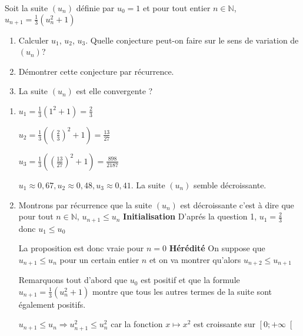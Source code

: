 
%
Soit la suite $\left(u_{n}\right)$ définie par $u_{0}=1$ et pour tout entier $n \in  \mathbb{N}$, $u_{n+1}=\frac{1}{3}\left(u_{n}^{2}+1\right)$
\begin{enumerate}
     \item
     Calculer $u_{1}$, $u_{2}$, $u_{3}$. Quelle conjecture peut-on faire sur le sens de variation de $\left(u_{n}\right)$?
     \item
     Démontrer cette conjecture par récurrence.
     \item
     La suite $\left(u_{n}\right)$ est elle convergente ?
\end{enumerate}
\begin{corrige}
     \begin{enumerate}
          \item
          $u_{1}=\frac{1}{3}\left(1^{2}+1\right)=\frac{2}{3}$
          \par
          $u_{2}=\frac{1}{3}\left(\left(\frac{2}{3}\right)^{2}+1\right)=\frac{13}{27}$
          \par
          $u_{3}=\frac{1}{3}\left(\left(\frac{13}{27}\right)^{2}+1\right)=\frac{898}{2187}$
          \par
          $u_{1}\approx 0,67,  u_{2}\approx 0,48,  u_{3}\approx 0,41$. La suite $\left(u_{n}\right)$ semble décroissante.
          \item
          Montrons par récurrence que la suite $\left(u_{n}\right)$ est décroissante c'est à dire que pour tout $n \in  \mathbb{N}$, $u_{n+1}\leqslant u_{n}$
          \textbf{Initialisation}
          D'aprés la question 1, $u_{1}=\frac{2}{3}$ donc $u_{1}\leqslant u_{0}$
          \par
          La proposition est donc vraie pour $n=0$
          \textbf{Hérédité}
          On suppose que $u_{n+1}\leqslant u_{n}$ pour un certain entier $n$ et on va montrer qu'alors $u_{n+2} \leqslant  u_{n+1}$
          \par
          Remarquons tout d'abord que $u_{0}$ est positif et que la formule $u_{n+1}=\frac{1}{3}\left(u_{n}^{2}+1\right)$ montre que tous les autres termes de la suite sont également positifs.
          \par
          $u_{n+1} \leqslant  u_{n} \Rightarrow  u_{n+1}^{2} \leqslant  u_{n}^{2} $ car la fonction $x\mapsto x^{2}$ est croissante sur $\left[0;+\infty \right[$
          \par

\end{enumerate}
\end{corrige}

